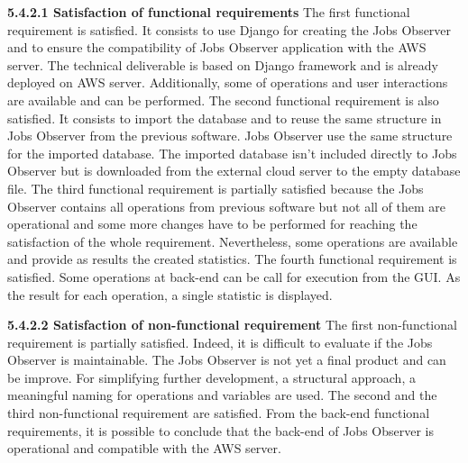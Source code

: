 \documentclass[conference,compsoc]{IEEEtran}
\begin{document}
\noindent
\newline\newline
\textbf{5.4.2.1 Satisfaction of functional requirements}
\newline\newline
The first functional requirement is satisfied. It consists to use Django for creating the Jobs Observer and to ensure the compatibility of Jobs Observer application with the AWS server. The technical deliverable is based on Django framework and is already deployed on AWS server. Additionally, some of  operations and user interactions are available and can be performed. 
\newline
The second functional requirement is also satisfied. It consists to import the database and to reuse the same structure in Jobs Observer from the previous software.  Jobs Observer use the same structure for the imported database. The imported database isn't included directly to Jobs Observer but is downloaded from the external cloud server to the empty database file. 
\newline
The third functional requirement is partially satisfied because the Jobs Observer contains all operations from previous software but not all of them are operational and some more changes have to be performed for reaching the satisfaction of the whole requirement. Nevertheless, some operations are available and provide as results the created statistics. 
\newline
The fourth functional requirement is satisfied. Some operations at back-end can be call for execution from the GUI. As the result for each operation, a single statistic is displayed. 

\noindent
\newline\newline
\textbf{5.4.2.2 Satisfaction of non-functional requirement}
\newline\newline
The first non-functional requirement is partially satisfied. Indeed, it is difficult to evaluate if the Jobs Observer is maintainable. The Jobs Observer is not yet a final product and can be improve. For simplifying further development, a structural approach, a meaningful naming for operations and variables are used. 
\newline
The second and the third non-functional requirement are satisfied. From the back-end functional requirements, it is possible to conclude that the back-end of Jobs Observer is operational and compatible with the AWS server. 
\end{document}
